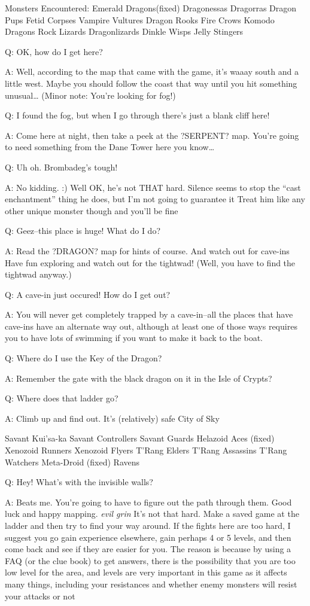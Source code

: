 \documentclass[12pt]{article}
\begin{document}
Monsters Encountered: Emerald Dragons(fixed) Dragonessas Dragorras
Dragon Pups Fetid Corpses Vampire Vultures Dragon Rooks Fire Crows
Komodo Dragons Rock Lizards Dragonlizards Dinkle Wisps Jelly Stingers

Q: OK, how do I get here?

A: Well, according to the map that came with the game, it's waaay south
and a little west. Maybe you should follow the coast that way until you
hit something unusual\ldots{} (Minor note: You're looking for fog!)

Q: I found the fog, but when I go through there's just a blank cliff
here!

A: Come here at night, then take a peek at the ?SERPENT? map. You're
going to need something from the Dane Tower here you know\ldots{}

Q: Uh oh. Brombadeg's tough!

A: No kidding. :) Well OK, he's not THAT hard. Silence seems to stop the
``cast enchantment'' thing he does, but I'm not going to guarantee it
Treat him like any other unique monster though and you'll be fine

Q: Geez--this place is huge! What do I do?

A: Read the ?DRAGON? map for hints of course. And watch out for cave-ins
Have fun exploring and watch out for the tightwad! (Well, you have to
find the tightwad anyway.)

Q: A cave-in just occured! How do I get out?

A: You will never get completely trapped by a cave-in--all the places
that have cave-ins have an alternate way out, although at least one of
those ways requires you to have lots of swimming if you want to make it
back to the boat.

Q: Where do I use the Key of the Dragon?

A: Remember the gate with the black dragon on it in the Isle of Crypts?

Q: Where does that ladder go?

A: Climb up and find out. It's (relatively) safe City of Sky

Savant Kui'sa-ka Savant Controllers Savant Guards Helazoid Aces (fixed)
Xenozoid Runners Xenozoid Flyers T'Rang Elders T'Rang Assassins T'Rang
Watchers Meta-Droid (fixed) Ravens

Q: Hey! What's with the invisible walls?

A: Beats me. You're going to have to figure out the path through them.
Good luck and happy mapping. \emph{evil grin} It's not that hard. Make a
saved game at the ladder and then try to find your way around. If the
fights here are too hard, I suggest you go gain experience elsewhere,
gain perhaps 4 or 5 levels, and then come back and see if they are
easier for you. The reason is because by using a FAQ (or the clue book)
to get answers, there is the possibility that you are too low level for
the area, and levels are very important in this game as it affects many
things, including your resistances and whether enemy monsters will
resist your attacks or not
\end{document}
